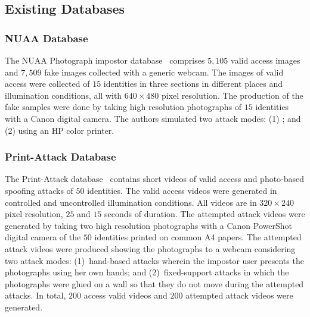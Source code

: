 \documentclass[journal]{IEEEtran}
\providecommand{\rv}[1]{{\protect\color{black}{#1}}}
\providecommand{\bmark}[1]{{\protect\color{black}{#1}}}
\begin{document}
\subsection{Existing Databases}
\label{sec:databases}

\subsubsection{NUAA Database}
\label{sec:nuaa}
The NUAA Photograph impostor database~\cite{Tan:ECCV:2010} comprises $5,105$ valid access images and $7,509$ fake images collected with a generic webcam. The images of valid access were collected of $15$ identities in three sections in different places and illumination conditions, all with $640 \times 480$ pixel resolution. The production of the fake samples were done by taking high resolution photographs of $15$ identities with a Canon digital camera. The authors simulated two attack modes: (1) \bmark{printing photographs on photo paper}; and (2) \bmark{printing the photographs on A4 paper} using an HP color printer. 

\subsubsection{Print-Attack Database}
\label{sec:print:attack}
The Print-Attack database~\cite{Anjos:IJCB:2011} contains short videos of valid access and photo-based spoofing attacks of $50$ identities. The valid access videos were generated in controlled and uncontrolled illumination conditions. All videos are in $320 \times 240$ pixel resolution, $25$ \rv{frames per second (fps)} and $15$ seconds of duration. The attempted attack videos were generated by taking two high resolution photographs with a Canon PowerShot digital camera of the $50$ identities printed on common A4 papers. The attempted attack videos were produced  showing the photographs to a webcam considering two attack modes: (1)~hand-based attacks wherein the impostor user presents the photographs using her own hands; and (2)~fixed-support attacks in which the photographs were glued on a wall so that they do not move during the attempted attacks. In total, $200$ access valid videos and $200$ attempted attack videos were generated.
\end{document}
